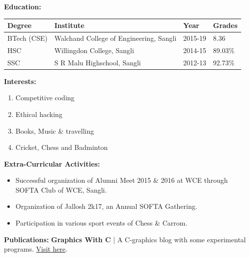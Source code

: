 \documentclass[11pt]{article}
\begin{document}
\begin{center}
\begin{LARGE}
			\textbf{Education:}
			\medskip%
			\begin{tabu} to \textwidth {|X[l]|X[4]|X[c]|X[c]|}
				\toprule
			   	\textbf{Degree} & \textbf{Institute} & \textbf{Year} & \textbf{Grades}\\
			   \hline
			   BTech (CSE) & Walchand College of Engineering, Sangli & 2015-19 & 8.36\\
			   \hline
			   HSC & Willingdon College, Sangli & 2014-15 & 89.03\%\\
			   \hline
			   SSC & S R Malu Highschool, Sangli & 2012-13 & 92.73\%\\
			   \bottomrule
			\end{tabu}
		\end{LARGE}
		\begin{minipage}[t]{0.35\textwidth}
			\raggedright\smallskip
			\begin{LARGE}
				\textbf{Interests:}\medskip%
				{\small
					\begin{enumerate}[label=(\alph*)]
						\item Competitive coding
						\item Ethical hacking
						\item Books, Music \& travelling
						\item Cricket, Chess and Badminton
					\end{enumerate}
				}
			\end{LARGE}
		\end{minipage}%
		\begin{minipage}[t]{0.65\textwidth}
			\raggedright\smallskip
			\begin{LARGE}
				\textbf{Extra-Curricular Activities:}\medskip%
				{\small
					\begin{itemize}
						\item Successful organization of Alumni Meet 2015 \& 2016 at WCE through SOFTA Club of WCE, Sangli.
						\item Organization of Jallosh 2k17, an Annual SOFTA Gathering.
						\item Participation in various sport events of Chess \& Carrom.
					\end{itemize}
				}
			\end{LARGE}								
		\end{minipage}
		\linebreak\linebreak\linebreak\linebreak
		\begin{minipage}[b]{0.33333\textwidth}
			\raggedright
			\begin{LARGE}
				\textbf{Publications:}\linebreak\linebreak%
				{\small
				\textbf{Graphics With C} | A C-graphics blog with some experimental programs. \href{https://graphicswithc.wordpress.com/}{Visit here}.
				}
			\end{LARGE}
		\end{minipage}%
		\begin{minipage}[b]{0.33333\textwidth}
			\raggedright
			\begin{LARGE}
				

\end{LARGE}
\end{minipage}
\end{center}
\end{document}
